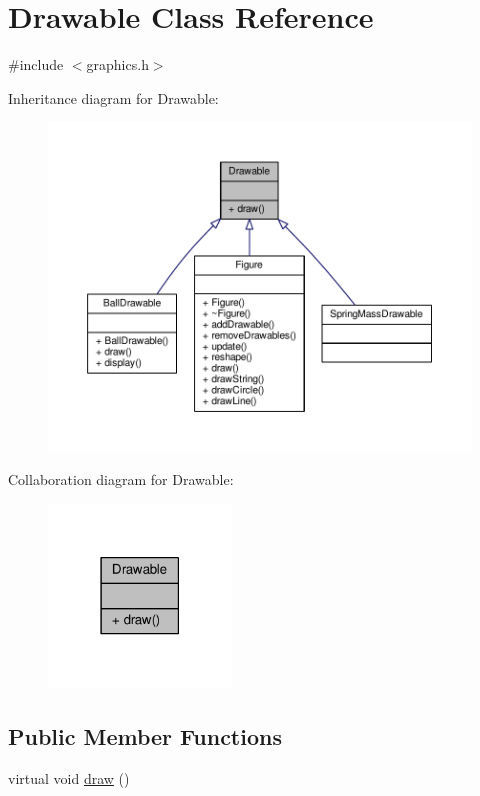 \hypertarget{classDrawable}{}\section{Drawable Class Reference}
\label{classDrawable}


{\ttfamily \#include $<$graphics.\+h$>$}



Inheritance diagram for Drawable\+:
\nopagebreak
\begin{figure}[H]
\begin{center}
\leavevmode
\includegraphics[width=350pt]{classDrawable__inherit__graph}
\end{center}
\end{figure}


Collaboration diagram for Drawable\+:
\nopagebreak
\begin{figure}[H]
\begin{center}
\leavevmode
\includegraphics[width=138pt]{classDrawable__coll__graph}
\end{center}
\end{figure}
\subsection*{Public Member Functions}
\begin{DoxyCompactItemize}
\item 
virtual void \hyperlink{classDrawable_a1231e00fe6022c2ff0e8d61fd23c5c23}{draw} ()
\end{DoxyCompactItemize}


